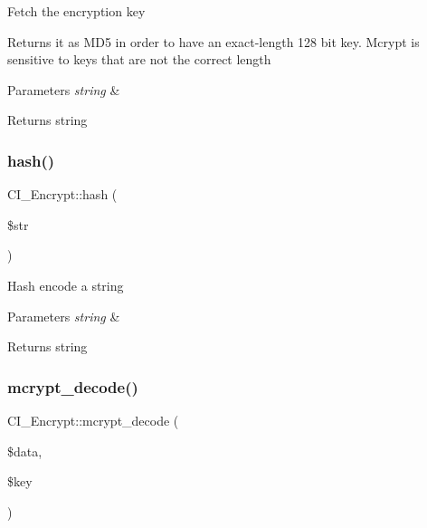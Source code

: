 Fetch the encryption key

Returns it as M\+D5 in order to have an exact-\/length 128 bit key. Mcrypt is sensitive to keys that are not the correct length


\begin{DoxyParams}{Parameters}
{\em string} & \\
\hline
\end{DoxyParams}
\begin{DoxyReturn}{Returns}
string 
\end{DoxyReturn}
\mbox{\label{class_c_i___encrypt_aad37b41424590ccb444d8a08690955cb}} 
\subsubsection{\texorpdfstring{hash()}{hash()}}
{\footnotesize\ttfamily C\+I\+\_\+\+Encrypt\+::hash (\begin{DoxyParamCaption}\item[{}]{\$str }\end{DoxyParamCaption})}

Hash encode a string


\begin{DoxyParams}{Parameters}
{\em string} & \\
\hline
\end{DoxyParams}
\begin{DoxyReturn}{Returns}
string 
\end{DoxyReturn}
\mbox{\label{class_c_i___encrypt_a611752b3b91a1fb19edf7addc8109fc3}} 
\subsubsection{\texorpdfstring{mcrypt\+\_\+decode()}{mcrypt\_decode()}}
{\footnotesize\ttfamily C\+I\+\_\+\+Encrypt\+::mcrypt\+\_\+decode (\begin{DoxyParamCaption}\item[{}]{\$data,  }\item[{}]{\$key }\end{DoxyParamCaption})}

